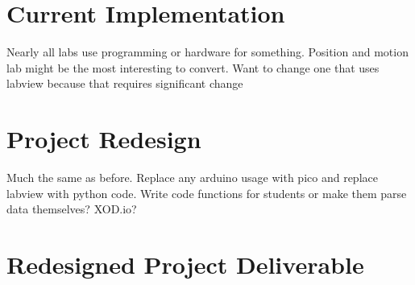 \section{Current Implementation}
Nearly all labs use programming or hardware for something. Position 
and motion lab might be the most interesting to convert. Want to 
change one that uses labview because that requires significant change

\section{Project Redesign}
Much the same as before. Replace any arduino usage with pico and 
replace labview with python code. Write code functions for students 
or make them parse data themselves? XOD.io?

\section{Redesigned Project Deliverable}
